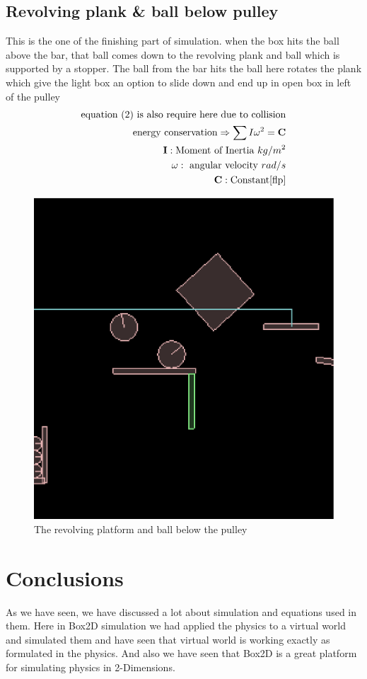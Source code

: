 \documentclass[11pt]{article}
\begin{document}
\subsection{Revolving plank \& ball below pulley}
This is the one of the finishing part of simulation. when the box hits the ball above the bar, that ball comes down to the revolving 
plank and ball which is supported by a stopper. The ball from the bar hits the ball here rotates the plank which give the light box an
option to slide down and end up in open box in left of the pulley
\begin{equation}
\begin{split}
\text{equation (2) is also require here due to collision}\\
\text{energy conservation} \Rightarrow \sum I \omega ^2= \mathbf{C} \\
\mathbf{I} : \text{Moment of Inertia } kg/m^2\\
\mathbf{\omega} : \text{ angular velocity } rad/s\\
\mathbf{C} : \text{Constant} \cite{flp}
\end{split}
\end{equation}
\begin{figure}[!ht]
\centering
\includegraphics[scale=0.25]{revolve_platform}
\caption{The revolving platform and ball below the pulley}
\label{fig3}
\end{figure}
\section{Conclusions}
As we have seen, we have discussed a lot about simulation and equations used in them.
Here in Box2D simulation we had applied the physics to a virtual world and simulated them and 
have seen that virtual world is working exactly as formulated in the physics. And also we have seen
that Box2D is a great platform for simulating physics in 2-Dimensions.


\end{document}
